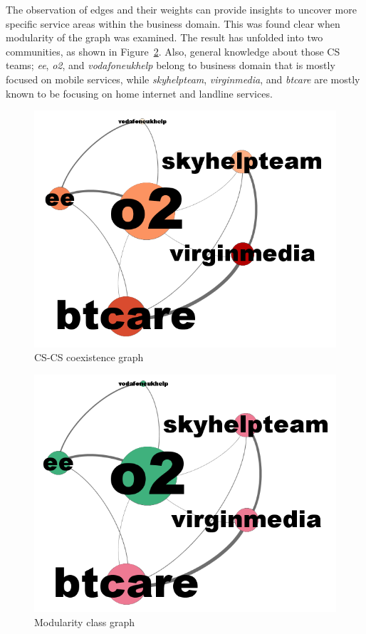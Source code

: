 \documentclass[sigconf]{acmart}
\begin{document}
The observation of edges and their weights can provide insights to
uncover more specific service areas within the business domain. This
was found clear when modularity of the graph was examined. The result
has unfolded into two communities, as shown in
Figure~\ref{fig:modularityclassgraph}. Also, general knowledge about
those CS teams; {\emph{ee}}, {\emph{o2}}, and {\emph{vodafoneukhelp}}
belong to business domain that is mostly focused on mobile services,
while {\emph{skyhelpteam}}, {\emph{virginmedia}}, and {\emph{btcare}}
are mostly known to be focusing on home internet and landline
services.

\begin{figure}[htb]
\centering
\includegraphics[width=\columnwidth]{images/coexistencegraph.png}
\caption{CS-CS coexistence graph}
\label{fig:coexistencegraph}
\end{figure}

\begin{figure}[htb]
\centering
\includegraphics[width=\columnwidth]{images/modularityclassgraph.png}
\caption{Modularity class graph}
\label{fig:modularityclassgraph}
\end{figure}
\end{document}
